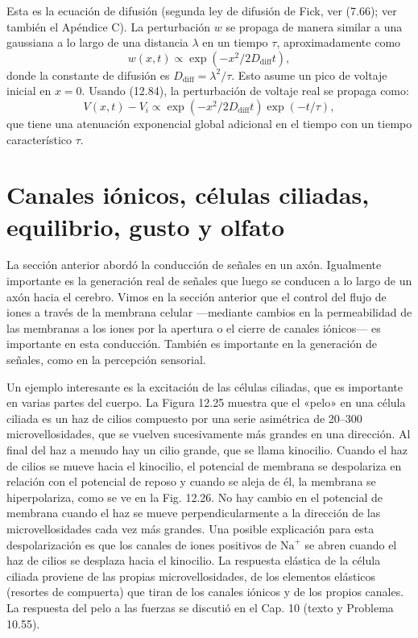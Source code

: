 \documentclass[12pt]{book}
\begin{document}
Esta es la ecuación de difusión (segunda ley de difusión de Fick, ver (7.66); ver también el Apéndice C). La perturbación $w$ se propaga de manera similar a una gaussiana a lo largo de una distancia $\lambda$ en un tiempo $\tau$, aproximadamente como
\begin{equation}
w(x, t) \propto \exp(-x^2/2D_{\text{diff}}t),
\label{eq:12.86}
\end{equation}
donde la constante de difusión es $D_{\text{diff}} = \lambda^2/\tau$. Esto asume un pico de voltaje inicial en $x = 0$. Usando (12.84), la perturbación de voltaje real se propaga como:
\begin{equation}
V(x, t) - V_i \propto \exp(-x^2/2D_{\text{diff}}t) \exp(-t/\tau),
\label{eq:12.87}
\end{equation}
que tiene una atenuación exponencial global adicional en el tiempo con un tiempo característico $\tau$.

\section[Canales Iónicos, Equilibrio y Sentidos]{Canales iónicos, células ciliadas, equilibrio, gusto y olfato}
\label{sec:12.4}

La sección anterior abordó la conducción de señales en un axón. Igualmente importante es la generación real de señales que luego se conducen a lo largo de un axón hacia el cerebro. Vimos en la sección anterior que el control del flujo de iones a través de la membrana celular ---mediante cambios en la permeabilidad de las membranas a los iones por la apertura o el cierre de canales iónicos--- es importante en esta conducción. También es importante en la generación de señales, como en la percepción sensorial.

Un ejemplo interesante es la excitación de las células ciliadas, que es importante en varias partes del cuerpo. La Figura 12.25 muestra que el «pelo» en una célula ciliada es un haz de cilios compuesto por una serie asimétrica de 20--300 microvellosidades, que se vuelven sucesivamente más grandes en una dirección. Al final del haz a menudo hay un cilio grande, que se llama kinocilio. Cuando el haz de cilios se mueve hacia el kinocilio, el potencial de membrana se despolariza en relación con el potencial de reposo y cuando se aleja de él, la membrana se hiperpolariza, como se ve en la Fig. 12.26. No hay cambio en el potencial de membrana cuando el haz se mueve perpendicularmente a la dirección de las microvellosidades cada vez más grandes. Una posible explicación para esta despolarización es que los canales de iones positivos de $\text{Na}^+$ se abren cuando el haz de cilios se desplaza hacia el kinocilio. La respuesta elástica de la célula ciliada proviene de las propias microvellosidades, de los elementos elásticos (resortes de compuerta) que tiran de los canales iónicos y de los propios canales. La respuesta del pelo a las fuerzas se discutió en el Cap. 10 (texto y Problema 10.55).
\end{document}

